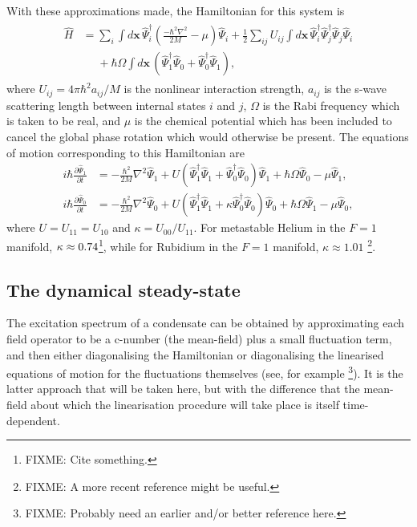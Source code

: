 With these approximations made, the Hamiltonian for this system is
\begin{align}
    \begin{split}
    \hat{H} &= \sum_i \int d\mathbf{x}\, \hat{\Psi}_i^\dagger \left(\frac{-\hbar^2 \nabla^2}{2 M} - \mu\right)\hat{\Psi}_i^{} + \frac{1}{2} \sum_{i j} U_{i j}\int d\mathbf{x}\, \hat{\Psi}_i^\dagger \hat{\Psi}_j^\dagger \hat{\Psi}_j^{} \hat{\Psi}_i^{}\\
            &\phantom{=} + \hbar \Omega \int d\mathbf{x}\, \left(\hat{\Psi}_1^\dagger \hat{\Psi}_0^{} + \hat{\Psi}_0^\dagger \hat{\Psi}_1^{}\right),
    \end{split}
\end{align}
where $U_{ij} = 4\pi \hbar^2 a_{ij}/M$ is the nonlinear interaction strength, $a_{ij}$ is the s-wave scattering length between internal states $i$ and $j$, $\Omega$ is the Rabi frequency which is taken to be real, and $\mu$ is the chemical potential which has been included to cancel the global phase rotation which would otherwise be present. The equations of motion corresponding to this Hamiltonian are
\begin{subequations}
    \label{Peaks:OperatorEquationsOfMotion}
    \begin{align}
    i \hbar \frac{\partial \hat{\Psi}_1}{\partial t}  &= -\frac{\hbar^2}{2M}\nabla^2 \hat{\Psi}_1  + U \left(\hat{\Psi}_1^\dagger \hat{\Psi}_1^{} + \hat{\Psi}_0^\dagger \hat{\Psi}_0^{}\right) \hat{\Psi}_1^{} + \hbar \Omega \hat{\Psi}_0^{} - \mu \hat{\Psi}_1^{},  \\
    i \hbar \frac{\partial \hat{\Psi}_0}{\partial t} &= -\frac{\hbar^2}{2M} \nabla^2 \hat{\Psi}_0 + U \left(\hat{\Psi}_1^\dagger \hat{\Psi}_1^{} + \kappa \hat{\Psi}_0^\dagger \hat{\Psi}_0^{} \right) \hat{\Psi}_0^{} + \hbar \Omega \hat{\Psi}_1^{} - \mu \hat{\Psi}_0^{},
    \end{align}
\end{subequations}
where $U=U_{11}=U_{10}$ and $\kappa = U_{00}/U_{11}$. For metastable Helium in the $F=1$ manifold, $\protect{\kappa \approx 0.74}$\footnote{FIXME: Cite something.}, while for Rubidium in the $F=1$ manifold, $\kappa \approx 1.01$ \cite{Ho:1998}\footnote{FIXME: A more recent reference might be useful.}. 

\subsection{The dynamical steady-state}

The excitation spectrum of a condensate can be obtained by approximating each field operator to be a c-number (the mean-field) plus a small fluctuation term, and then either diagonalising the Hamiltonian \cite{Bogoliubov:1947,FetterWalecka} or diagonalising the linearised equations of motion for the fluctuations themselves (see, for example \cite{Ho:1998}\footnote{FIXME: Probably need an earlier and/or better reference here.}). It is the latter approach that will be taken here, but with the difference that the mean-field about which the linearisation procedure will take place is itself time-dependent.

